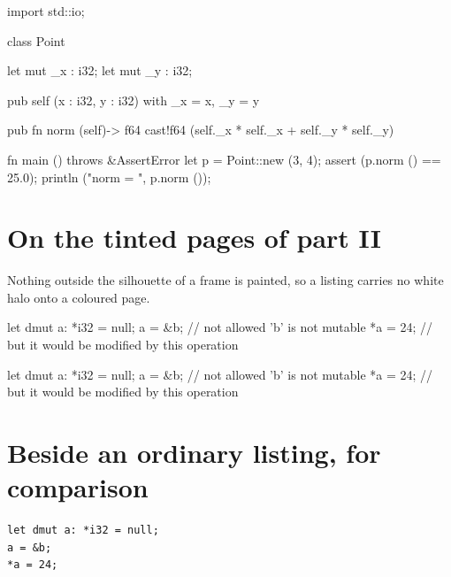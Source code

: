 \documentclass[twoside,a4paper,11pt]{book}
\begin{document}
\newpage
\begin{solidlisting}
import std::io;

class Point {
    let mut _x : i32;
    let mut _y : i32;

    pub self (x : i32, y : i32)
        with _x = x, _y = y
    {}

    pub fn norm (self)-> f64 {
        cast!f64 (self._x * self._x + self._y * self._y)
    }
}

fn main ()
    throws &AssertError
{
    let p = Point::new (3, 4);
    assert (p.norm () == 25.0);
    println ("norm = ", p.norm ());
}
\end{solidlisting}

\newpage
\pagecolor{gray!10!white}
\section*{On the tinted pages of part II}

Nothing outside the silhouette of a frame is painted, so a listing carries no
white halo onto a coloured page.

\begin{brokenlisting}
let dmut a: *i32 = null;
a = &b; // not allowed 'b' is not mutable
*a = 24; // but it would be modified by this operation
\end{brokenlisting}

\begin{solidlisting}
let dmut a: *i32 = null;
a = &b; // not allowed 'b' is not mutable
*a = 24; // but it would be modified by this operation
\end{solidlisting}

\section*{Beside an ordinary listing, for comparison}

\begin{lstlisting}[style=coloredverbatim]
let dmut a: *i32 = null;
a = &b;
*a = 24;
\end{lstlisting}
\end{document}
